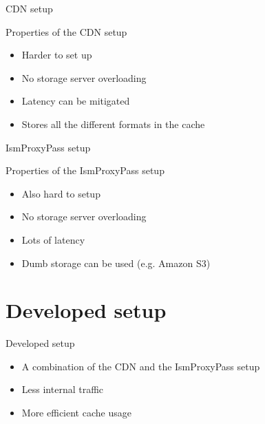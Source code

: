 \documentclass[xcolor=svgnames]{beamer}
\begin{document}
\begin{frame}{CDN setup}
    \begin{figure}

        \resizebox{\textwidth}{!}{%
            
        }
    \end{figure}
\end{frame}

\begin{frame}{Properties of the CDN setup}
  \begin{itemize}
  \item Harder to set up
  \item No storage server overloading
  \item Latency can be mitigated
  \item Stores all the different formats in the cache
  \end{itemize}
\end{frame}

\begin{frame}{IsmProxyPass setup}
    \begin{figure}

        \resizebox{\textwidth}{!}{%
            
        }
    \end{figure}
\end{frame}

\begin{frame}{Properties of the IsmProxyPass setup}
  \begin{itemize}
  \item Also hard to setup
  \item No storage server overloading
  \item Lots of latency
  \item Dumb storage can be used (e.g. Amazon S3)
  \end{itemize}
\end{frame}


\section{Developed setup}

\begin{frame}{Developed setup}
    \begin{itemize}
        \item A combination of the CDN and the IsmProxyPass setup
        \item Less internal traffic
        \item More efficient cache usage
    \end{itemize}
\end{frame}
\end{document}
